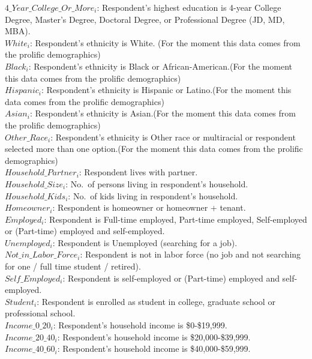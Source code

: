 \documentclass[11pt]{article}
\begin{document}
$4\_Year\_College\_Or\_More_i$: Respondent's highest education is 4-year College Degree, Master’s Degree, Doctoral Degree, or Professional Degree (JD, MD, MBA). \\[0.15em]
$White_i$: Respondent's ethnicity is White. (For the moment this data comes from the prolific demographics)\\[0.15em]
$Black_i$: Respondent's ethnicity is Black or African-American.(For the moment this data comes from the prolific demographics) \\[0.15em]
$Hispanic_i$: Respondent's ethnicity is Hispanic or Latino.(For the moment this data comes from the prolific demographics) \\[0.15em]
$Asian_i$: Respondent's ethnicity is Asian.(For the moment this data comes from the prolific demographics) \\[0.15em]
$Other\_Race_i$: Respondent's ethnicity is Other race or multiracial or respondent selected more than one option.(For the moment this data comes from the prolific demographics) \\[0.15em]
$Household\_Partner_i$: Respondent lives with partner. \\[0.15em]
$Household\_Size_i$: No.\ of persons living in respondent's household. \\[0.15em]
$Household\_Kids_i$: No.\ of kids living in respondent's household. \\[0.15em]
$Homeowner_i$: Respondent is homeowner or homeowner + tenant. \\[0.15em]
$Employed_i$: Respondent is Full-time employed, Part-time employed, Self-employed or (Part-time) employed and self-employed. \\[0.15em]
$Unemployed_i$: Respondent is Unemployed (searching for a job). \\[0.15em]
$Not\_in\_Labor\_Force_i$: Respondent is not in labor force (no job and not searching for one / full time student / retired). \\[0.15em]
$Self\_Employed_i$: Respondent is self-employed or (Part-time) employed and self-employed. \\[0.15em]
$Student_i$: Respondent is enrolled as student in college, graduate school or professional school. \\[0.15em]
$Income\_0\_20_i$: Respondent's household income is \$0-\$19,999. \\[0.15em]
$Income\_20\_40_i$: Respondent's household income is \$20,000-\$39,999. \\[0.15em]
$Income\_40\_60_i$: Respondent's household income is \$40,000-\$59,999. \\[0.15em]
\end{document}

